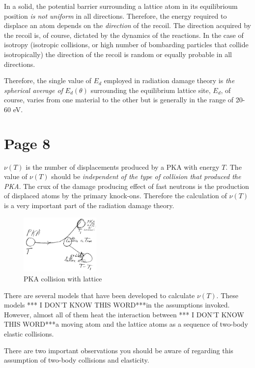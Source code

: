\documentclass[11pt]{report} %
\newcommand{\IDK}{*** I DON'T KNOW THIS WORD***}
\begin{document}
In a solid, the potential barrier surrounding a lattice atom in its equilibrioum position \textit{is not uniform} in all directions. Therefore, the energy required to displace an atom depends on the \textit{direction} of the recoil. The direction acquired by the recoil is, of course, dictated by the dynamics of the reactions. In the case of isotropy (isotropic collisions, or high number of bombarding particles that collide isotropically) the direction of the recoil is random or equally probable in all directions.

Therefore, the single value of $E_d$ employed in radiation damage theory is \textit{the spherical average of} $E_d(\theta)$ surrounding the equilibrium lattice site, $E_d$, of course, varies from one material to the other but is generally in the range of 20-60 eV.

\section{Page 8}
$\nu(T)$ is the number of displacements produced by a PKA with energy $T$. The value of $\nu(T)$ should be \textit{independent of the type of collision that produced the PKA}. The crux of the damage producing effect of fast neutrons is the production of displaced atoms by the primary knock-ons. Therefore the calculation of $\nu(T)$ is a very important part of the radiation damage theory.

\begin{figure}
  \begin{center}
  \includegraphics[width=0.35\textwidth]{sketches/sketch3.png}
  \end{center}
  \caption{PKA collision with lattice}
\end{figure}

There are several models that have been developed to calculate $\nu(T)$. These models \IDK in the assumptions invoked. However, almost all of them heat the interaction between \IDK a moving atom and the lattice atoms as a sequence of two-body elastic collisions.

There are two important observations you should be aware of regarding this assumption of two-body collisions and elasticity.
\end{document}
